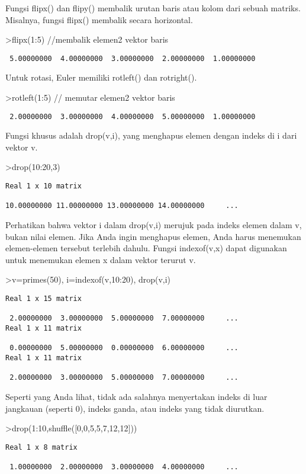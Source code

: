 \documentclass[
]{book}
\begin{document}
Fungsi flipx() dan flipy() membalik urutan baris atau kolom dari sebuah matriks. Misalnya, fungsi flipx() membalik secara horizontal.

\textgreater flipx(1:5) //membalik elemen2 vektor baris

\begin{verbatim}
 5.00000000  4.00000000  3.00000000  2.00000000  1.00000000 
\end{verbatim}

Untuk rotasi, Euler memiliki rotleft() dan rotright().

\textgreater rotleft(1:5) // memutar elemen2 vektor baris

\begin{verbatim}
 2.00000000  3.00000000  4.00000000  5.00000000  1.00000000 
\end{verbatim}

Fungsi khusus adalah drop(v,i), yang menghapus elemen dengan indeks di i dari vektor v.

\textgreater drop(10:20,3)

\begin{verbatim}
Real 1 x 10 matrix

10.00000000 11.00000000 13.00000000 14.00000000     ...
\end{verbatim}

Perhatikan bahwa vektor i dalam drop(v,i) merujuk pada indeks elemen dalam v, bukan nilai elemen. Jika Anda ingin menghapus elemen, Anda harus menemukan elemen-elemen tersebut terlebih dahulu. Fungsi indexof(v,x) dapat digunakan untuk menemukan elemen x dalam vektor terurut v.

\textgreater v=primes(50), i=indexof(v,10:20), drop(v,i)

\begin{verbatim}
Real 1 x 15 matrix

 2.00000000  3.00000000  5.00000000  7.00000000     ...
Real 1 x 11 matrix

 0.00000000  5.00000000  0.00000000  6.00000000     ...
Real 1 x 11 matrix

 2.00000000  3.00000000  5.00000000  7.00000000     ...
\end{verbatim}

Seperti yang Anda lihat, tidak ada salahnya menyertakan indeks di luar jangkauan (seperti 0), indeks ganda, atau indeks yang tidak diurutkan.

\textgreater drop(1:10,shuffle({[}0,0,5,5,7,12,12{]}))

\begin{verbatim}
Real 1 x 8 matrix

 1.00000000  2.00000000  3.00000000  4.00000000     ...
\end{verbatim}
\end{document}
